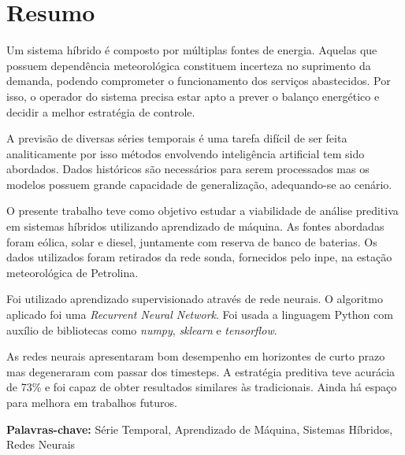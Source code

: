 \clearpage

\section*{\centering Resumo}

Um sistema híbrido é composto por múltiplas fontes de energia.
Aquelas que possuem dependência meteorológica constituem incerteza no suprimento
da demanda, podendo comprometer o funcionamento dos serviços abastecidos. Por
isso, o operador do sistema precisa estar apto a prever o balanço energético e
decidir a melhor estratégia de controle.

A previsão de diversas séries temporais é uma tarefa difícil de ser feita
analiticamente por isso métodos envolvendo inteligência artificial tem sido
abordados. Dados históricos são necessários para serem processados mas os
modelos possuem grande capacidade de generalização, adequando-se ao cenário.

O presente trabalho teve como objetivo estudar a viabilidade de análise
preditiva em sistemas híbridos utilizando aprendizado de máquina. As fontes
abordadas foram eólica, solar e diesel, juntamente com reserva de banco de
baterias.  Os dados utilizados foram retirados da rede \acrshort{sonda}, fornecidos pelo
\acrshort{inpe}, na estação meteorológica de Petrolina.

Foi utilizado aprendizado supervisionado através de rede neurais. O algoritmo
aplicado foi uma \emph{Recurrent Neural Network}. Foi usada a linguagem
Python com auxílio de bibliotecas como \emph{numpy}, \emph{sklearn} e \emph{tensorflow}.

As redes neurais apresentaram bom desempenho em horizontes de curto prazo mas
degeneraram com passar dos timesteps. A estratégia preditiva teve acurácia de
73\% e foi capaz de obter resultados similares às tradicionais. Ainda há espaço
para melhora em trabalhos futuros.

\vfill
\textbf{Palavras-chave:} Série Temporal, Aprendizado de Máquina, Sistemas
Híbridos, Redes Neurais
\vfill

